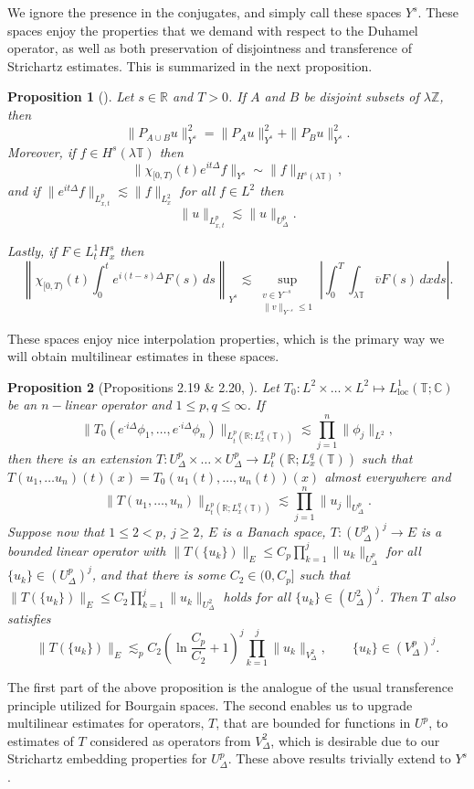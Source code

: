 \documentclass[12pt, letterpaper]{amsart}
\newtheorem{proposition}{Proposition}
\begin{document}
We ignore the presence in the conjugates, and simply call these spaces $Y^s$. These spaces enjoy the properties that we demand with respect to the Duhamel operator, as well as both preservation of disjointness and transference of Strichartz estimates. This is summarized in the next proposition.
\begin{proposition}[\cite{schippa2024improved, MR2526409}]\label{Proposition: Randoma atomic space facts}
    Let $s\in\mathbb{R}$ and $T > 0$. If $A$ and $B$ be disjoint subsets of $\lambda\mathbb{Z}$, then
    \[
    \|P_{A\cup B}u\|_{Y^s}^2 = \|P_A u\|_{Y^s}^2 + \|P_B u\|_{Y^s}^2.
    \]
    Moreover, if $f\in H^s(\lambda\mathbb{T})$ then 
    \[
    \|\chi_{[0,T)}(t)e^{it\Delta}f\|_{Y^s}\sim \|f\|_{H^s(\lambda\mathbb{T})},
    \]
    and if $\|e^{it\Delta}f\|_{L^p_{x,t}}\lesssim \|f\|_{L^2_x}$ for all $f\in L^2$ then
    \[
\|u\|_{L^p_{x,t}}\lesssim \|u\|_{U^p_{\Delta}}.
    \]
    
    Lastly, if $F\in L^1_tH^s_x$ then
    \[
    \left\|\chi_{[0,T)}(t)\int_0^te^{i(t-s)\Delta}F(s)\,ds\right\|_{Y^s}\lesssim \sup_{\substack{v\in Y^{-s}\\\|v\|_{Y^{-s}}\leq 1}}\left|\int_0^T\int_{\lambda\mathbb{T}}\overline{v}F(s)\,dxds\right|.
    \]
\end{proposition}
These spaces enjoy nice interpolation properties, which is the primary way we will obtain multilinear estimates in these spaces.
\begin{proposition}[Propositions 2.19 \& 2.20, \cite{MR2526409}]\label{Proposition: Interpolation Properties}
    Let $T_0:L^2\times\dots\times L^2\mapsto L^1_{\mathrm{loc}}(\mathbb{T};\mathbb{C})$ be an $n-$linear operator and $1\leq p,q \leq \infty$. If
    \[
\|T_0(e^{\cdot i\Delta}\phi_1,\dots,e^{\cdot i\Delta}\phi_n)\|_{L^p_t(\mathbb{R};L^q_x(\mathbb{T}))}\lesssim \prod_{j=1}^n\|\phi_j\|_{L^2},
    \]
    then there is an extension $T:U^p_\Delta\times\dots\times U^p_\Delta\to L^p_t(\mathbb{R};L^q_x(\mathbb{T}))$ such that $T(u_1,\dots u_n)(t)(x) = T_0(u_1(t),\dots, u_n(t))(x)$ almost everywhere and 
    \[
\|T(u_1,\dots,u_n)\|_{L^p_t(\mathbb{R};L^q_x(\mathbb{T}))}\lesssim \prod_{j=1}^n\|u_j\|_{U^p_\Delta}.
    \]
    Suppose now that $1\leq 2 < p$, $j \geq 2$, $E$ is a Banach space, $T:(U^p_\Delta)^j\to E$ is a bounded linear operator with $\|T(\{u_k\})\|_{E}\leq C_p\prod_{k=1}^j\|u_k\|_{U^p_\Delta}$ for all $\{u_k\}\in (U^p_\Delta)^j$, and that there is some $C_2\in (0, C_p]$ such that $\|T(\{u_k\})\|_{E}\leq C_2\prod_{k=1}^j\|u_k\|_{U^2_\Delta}$ holds for all $\{u_k\}\in (U^2_\Delta)^j$. Then $T$ also satisfies
    \[
\|T(\{u_k\})\|_{E}\lesssim_{p}C_2\left(\ln\frac{C_p}{C_2} + 1\right)^j\prod_{k=1}^j\|u_k\|_{V^2_\Delta},\qquad \{u_k\}\in (V^p_\Delta)^j.
    \]
\end{proposition}
The first part of the above proposition is the analogue of the usual transference principle utilized for Bourgain spaces. The second enables us to upgrade multilinear estimates for operators, $T$, that are bounded for functions in $U^p$, to estimates of $T$ considered as operators from $V^2_\Delta$, which is desirable due to our Strichartz embedding properties for $U^p_\Delta$. These above results trivially extend to $Y^s$.
\end{document}

